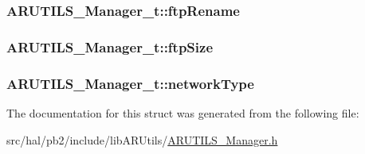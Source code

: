 \subsubsection[{\texorpdfstring{ftp\+Rename}{ftpRename}}]{ A\+R\+U\+T\+I\+L\+S\+\_\+\+Manager\+\_\+t\+::ftp\+Rename}\hypertarget{struct_a_r_u_t_i_l_s___manager__t_a0020057f85025d5036e48704549d095b}{}\label{struct_a_r_u_t_i_l_s___manager__t_a0020057f85025d5036e48704549d095b}
\subsubsection[{\texorpdfstring{ftp\+Size}{ftpSize}}]{ A\+R\+U\+T\+I\+L\+S\+\_\+\+Manager\+\_\+t\+::ftp\+Size}\hypertarget{struct_a_r_u_t_i_l_s___manager__t_a6916eded8c9f66f54a9407f0b2941588}{}\label{struct_a_r_u_t_i_l_s___manager__t_a6916eded8c9f66f54a9407f0b2941588}
\subsubsection[{\texorpdfstring{network\+Type}{networkType}}]{ A\+R\+U\+T\+I\+L\+S\+\_\+\+Manager\+\_\+t\+::network\+Type}\hypertarget{struct_a_r_u_t_i_l_s___manager__t_aa93ed3c759c870a3faa8274a923379b9}{}\label{struct_a_r_u_t_i_l_s___manager__t_aa93ed3c759c870a3faa8274a923379b9}


The documentation for this struct was generated from the following file\+:\begin{DoxyCompactItemize}
\item 
src/hal/pb2/include/lib\+A\+R\+Utils/\hyperlink{_a_r_u_t_i_l_s___manager_8h}{A\+R\+U\+T\+I\+L\+S\+\_\+\+Manager.\+h}\end{DoxyCompactItemize}
